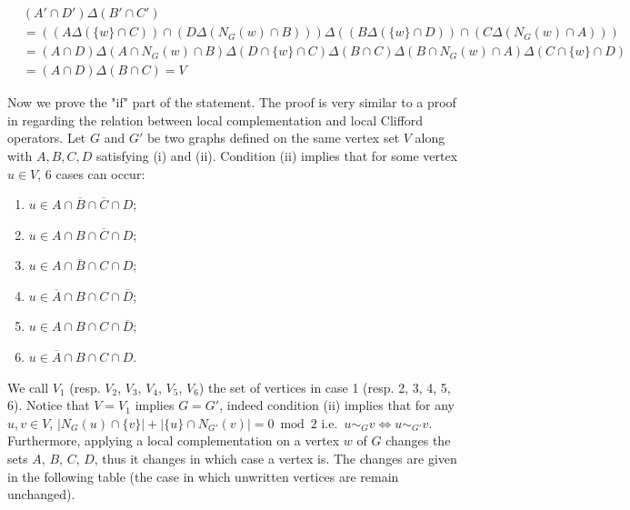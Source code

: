 \documentclass[a4paper,UKenglish,cleveref,autoref,thm-restate]{arxiv}
\begin{document}
\begin{align*}
    & (A'\cap D')\Delta(B'\cap C')\\
    &= \left((A \Delta ( \{w\}\cap C))\cap (D \Delta ( N_{G}(w)\cap B))\right)\Delta\left((B \Delta ( \{w\}\cap D))\cap (C \Delta ( N_{G}(w)\cap A))\right)\\
    &= (A\cap D)\Delta(A\cap N_{G}(w)\cap B)\Delta(D\cap \{w\}\cap C)\Delta(B\cap C)\Delta(B \cap  N_{G}(w)\cap A)\Delta(C \cap\{w\}\cap D)\\
    &=(A\cap D)\Delta(B\cap C) = V
\end{align*}

Now we prove the "if" part of the statement. The proof is very similar to a proof in \cite{claudet2024local} regarding the relation between local complementation and local Clifford operators. Let $G$ and $G'$ be two graphs defined on the same vertex set $V$ along with $A, B, C, D$ satisfying (i) and (ii). Condition (ii) implies that for some vertex $u \in V$, 6 cases can occur:
\begin{enumerate}
    \item $u \in A \cap \overline B \cap \overline C \cap D$; \item $u \in A \cap B \cap \overline C \cap D$; \item $u \in A \cap \overline B \cap C \cap D$; \item $u \in \overline A \cap B \cap C \cap \overline D$; \item $u \in A \cap B \cap C \cap \overline D$; \item $u \in \overline A \cap B \cap C \cap D$. \end{enumerate}
We call $V_1$ (resp. $V_2$, $V_3$, $V_4$, $V_5$, $V_6$) the set of vertices in case 1 (resp. 2, 3, 4, 5, 6). Notice that $V = V_1$ implies $G = G'$, indeed condition (ii) implies that for any $u,v \in V$, $|N_G(u)\cap \{v\}| +  |\{u\}\cap N_{G'}(v)| = 0 \bmod 2$ i.e.~$u \sim_G v \Leftrightarrow u \sim_{G'} v$. Furthermore, applying a local complementation on a vertex $w$ of $G$ changes the sets $A$, $B$, $C$, $D$, thus it changes in which case a vertex is. The changes are given in the following table (the case in which unwritten vertices are remain unchanged). 
\end{document}
